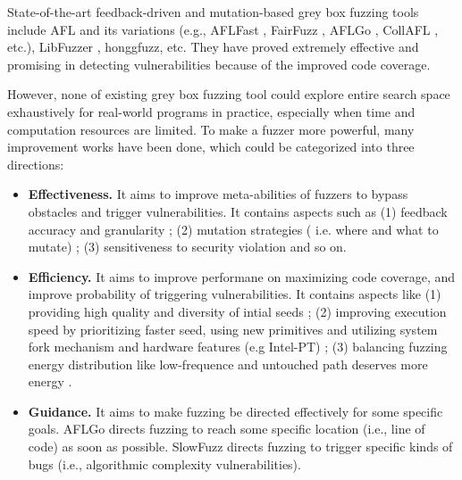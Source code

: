 State-of-the-art feedback-driven and mutation-based grey box fuzzing tools include AFL \cite{afl} and its variations (e.g., AFLFast \cite{bohme2016aflfast}, FairFuzz \cite{fairfuzz}, AFLGo \cite{bohme2017aflgo}, CollAFL \cite{gancollafl}, etc.), LibFuzzer \cite{infrastructure2017libfuzzer}, honggfuzz\cite{swiecki2016honggfuzz}, etc. They have proved extremely effective and promising in detecting vulnerabilities because of the improved code coverage. 

However, none of existing grey box fuzzing tool could explore entire search space exhaustively for real-world programs in practice, especially when time and computation resources are limited. To make a fuzzer more powerful, many improvement works have been done, which could be categorized into three directions:

\begin{itemize}
\item \textbf{Effectiveness.} It aims to improve meta-abilities of fuzzers to bypass obstacles and trigger vulnerabilities. It contains aspects such as (1) feedback accuracy \cite{gancollafl} and granularity \cite{li2017steelix}; (2) mutation strategies ( i.e. where and what to mutate) \cite{rawat2017vuzzer} \cite{peng2018t} \cite{wang2010taintscope} \cite{chen2013angora};  (3) sensitiveness to security violation \cite{serebryany2012addresssanitizer} \cite{stepanov2015memorysanitizer} and so on.
\item  \textbf{Efficiency.} It aims to improve performane on maximizing code coverage, and improve probability of triggering vulnerabilities. It contains aspects like (1) providing high quality and diversity of intial seeds \cite{wang2017skyfire} \cite{godefroid2017learn} \cite{nichols2017faster} \cite{lv2018smartseed}; (2) improving execution speed by prioritizing faster seed, using new primitives \cite{xu2017designing} and utilizing system fork mechanism and hardware features (e.g Intel-PT) \cite{schumilo2017kafl} \cite{zhang2018ptfuzz}; (3) balancing fuzzing energy distribution like low-frequence and untouched path deserves more energy \cite{bohme2016aflfast} \cite{rawat2017vuzzer} \cite{gancollafl}. 
\item \textbf{Guidance.} It aims to make fuzzing be directed effectively for some specific goals. AFLGo \cite{bohme2017aflgo} directs fuzzing to reach some specific location (i.e., line of code) as soon as possible. SlowFuzz \cite{petsios2017slowfuzz} directs fuzzing to trigger specific kinds of bugs (i.e., algorithmic complexity vulnerabilities).
\end{itemize}


